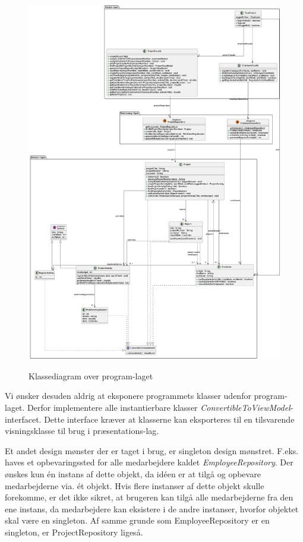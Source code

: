 \begin{figure}[H]
    \centering
    \caption{Klassediagram over program-laget}
    \includegraphics[width = \textwidth, keepaspectratio]{TaskFusion/out/assets/diagrams/class_persistency/ClassDiagram.png}
    \label{fig:class_persistency}
\end{figure}

Vi ønsker desuden aldrig at eksponere programmets klasser udenfor program-laget. Derfor implementere alle instantierbare klasser \textit{ConvertibleToViewModel}-interfacet. Dette interface kræver at klasserne kan eksporteres til en tilsvarende visningsklasse til brug i præsentations-lag. 

Et andet design mønster der er taget i brug, er singleton design mønstret. F.eks. haves et opbevaringssted for alle medarbejdere kaldet \textit{EmployeeRepository}. Der ønskes kun én instans af dette objekt, da idéen er at tilgå og opbevare medarbejderne via. ét objekt. Hvis flere instanser af dette objekt skulle forekomme, er det ikke sikret, at brugeren kan tilgå alle medarbejderne fra den ene instans, da medarbejdere kan eksistere i de andre instanser, hvorfor objektet skal være en singleton. Af samme grunde som EmployeeRepository er en singleton, er ProjectRepository ligeså.
\newline



